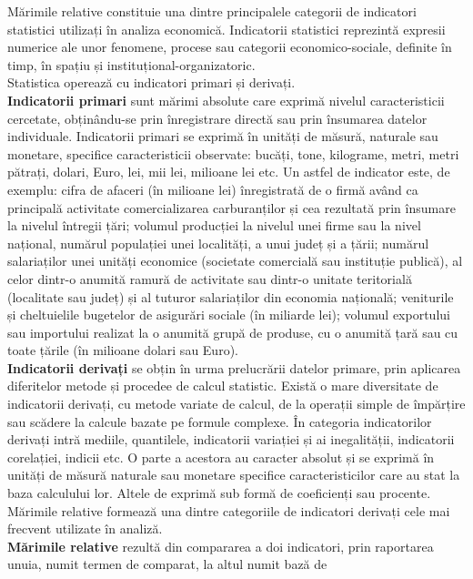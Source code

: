 \documentclass[
  11pt,
  b5paper,
  nottoc]{book}
\begin{document}
Mărimile relative constituie una dintre principalele categorii de
indicatori statistici utilizați în analiza economică. Indicatorii
statistici reprezintă expresii numerice ale unor fenomene, procese sau
categorii economico-sociale, definite în timp, în spațiu și
instituțional-organizatoric.\\
Statistica operează cu indicatori primari și derivați.\\
\textbf{Indicatorii primari} sunt mărimi absolute care exprimă nivelul
caracteristicii cercetate, obținându-se prin înregistrare directă sau
prin însumarea datelor individuale. Indicatorii primari se exprimă în
unități de măsură, naturale sau monetare, specifice caracteristicii
observate: bucăți, tone, kilograme, metri, metri pătrați, dolari, Euro,
lei, mii lei, milioane lei etc. Un astfel de indicator este, de exemplu:
cifra de afaceri (în milioane lei) înregistrată de o firmă având ca
principală activitate comercializarea carburanților și cea rezultată
prin însumare la nivelul întregii țări; volumul producției la nivelul
unei firme sau la nivel național, numărul populației unei localități, a
unui județ și a țării; numărul salariaților unei unități economice
(societate comercială sau instituție publică), al celor dintr-o anumită
ramură de activitate sau dintr-o unitate teritorială (localitate sau
județ) și al tuturor salariaților din economia națională; veniturile și
cheltuielile bugetelor de asigurări sociale (în miliarde lei); volumul
exportului sau importului realizat la o anumită grupă de produse, cu o
anumită țară sau cu toate țările (în milioane dolari sau Euro).\\
\textbf{Indicatorii derivați} se obțin în urma prelucrării datelor
primare, prin aplicarea diferitelor metode și procedee de calcul
statistic. Există o mare diversitate de indicatorii derivați, cu metode
variate de calcul, de la operații simple de împărțire sau scădere la
calcule bazate pe formule complexe. În categoria indicatorilor derivați
intră mediile, quantilele, indicatorii variației și ai inegalității,
indicatorii corelației, indicii etc. O parte a acestora au caracter
absolut și se exprimă în unități de măsură naturale sau monetare
specifice caracteristicilor care au stat la baza calculului lor. Altele
de exprimă sub formă de coeficienți sau procente. Mărimile relative
formează una dintre categoriile de indicatori derivați cele mai frecvent
utilizate în analiză.\\
\textbf{Mărimile relative} rezultă din compararea a doi indicatori, prin
raportarea unuia, numit termen de comparat, la altul numit bază de
\end{document}
